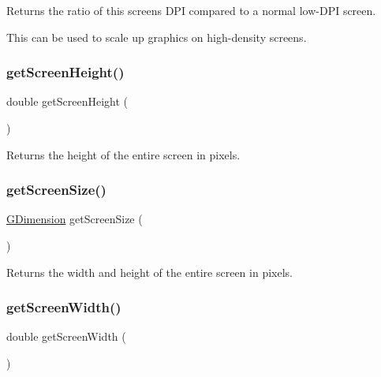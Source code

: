 Returns the ratio of this screen\textquotesingle{}s D\+PI compared to a normal low-\/\+D\+PI screen. 

This can be used to scale up graphics on high-\/density screens. \mbox{\label{classGWindow_a9942379fdf4fb4445c35eaf3390b7ccb}} 
\subsubsection{\texorpdfstring{get\+Screen\+Height()}{getScreenHeight()}}
{\footnotesize\ttfamily double get\+Screen\+Height (\begin{DoxyParamCaption}{ }\end{DoxyParamCaption})\hspace{0.3cm}{\ttfamily [static]}}



Returns the height of the entire screen in pixels. 

\mbox{\label{classGWindow_ae3d08d5cde8163274459797770596809}} 
\subsubsection{\texorpdfstring{get\+Screen\+Size()}{getScreenSize()}}
{\footnotesize\ttfamily \mbox{\hyperlink{structGDimension}{G\+Dimension}} get\+Screen\+Size (\begin{DoxyParamCaption}{ }\end{DoxyParamCaption})\hspace{0.3cm}{\ttfamily [static]}}



Returns the width and height of the entire screen in pixels. 

\mbox{\label{classGWindow_adc82933bd579ab83d7cd4e3bc5f79a12}} 
\subsubsection{\texorpdfstring{get\+Screen\+Width()}{getScreenWidth()}}
{\footnotesize\ttfamily double get\+Screen\+Width (\begin{DoxyParamCaption}{ }\end{DoxyParamCaption})\hspace{0.3cm}{\ttfamily [static]}}



